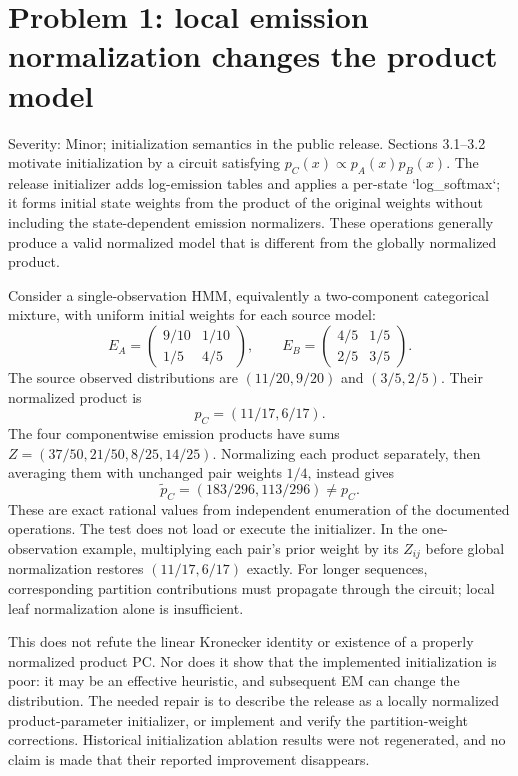 \documentclass[10pt]{article}
\begin{document}
\section*{Problem 1: local emission normalization changes the product model}
Severity: Minor; initialization semantics in the public release. Sections 3.1–3.2 motivate initialization by a circuit satisfying \(p_C(x)\propto p_A(x)p_B(x)\). The release initializer adds log-emission tables and applies a per-state `log\_softmax`; it forms initial state weights from the product of the original weights without including the state-dependent emission normalizers. These operations generally produce a valid normalized model that is different from the globally normalized product.\par
Consider a single-observation HMM, equivalently a two-component categorical mixture, with uniform initial weights for each source model: \[E_A=\begin{pmatrix}9/10&1/10\\1/5&4/5\end{pmatrix},\qquad
 E_B=\begin{pmatrix}4/5&1/5\\2/5&3/5\end{pmatrix}.\] The source observed distributions are \((11/20,9/20)\) and \((3/5,2/5)\). Their normalized product is \[p_C=(11/17,6/17).\] The four componentwise emission products have sums \(Z=(37/50,21/50,8/25,14/25)\). Normalizing each product separately, then averaging them with unchanged pair weights \(1/4\), instead gives \[\widetilde p_C=(183/296,113/296)\ne p_C.\] These are exact rational values from independent enumeration of the documented operations. The test does not load or execute the initializer. In the one-observation example, multiplying each pair’s prior weight by its \(Z_{ij}\) before global normalization restores \((11/17,6/17)\) exactly. For longer sequences, corresponding partition contributions must propagate through the circuit; local leaf normalization alone is insufficient.\par
This does not refute the linear Kronecker identity or existence of a properly normalized product PC. Nor does it show that the implemented initialization is poor: it may be an effective heuristic, and subsequent EM can change the distribution. The needed repair is to describe the release as a locally normalized product-parameter initializer, or implement and verify the partition-weight corrections. Historical initialization ablation results were not regenerated, and no claim is made that their reported improvement disappears.\par
\end{document}
